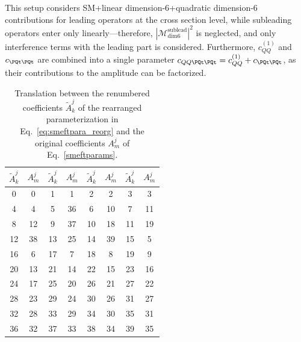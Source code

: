 This setup considers SM+linear dimension-6+quadratic dimension-6 contributions for leading operators at the cross section level, while subleading operators enter only linearly---therefore, $|\mathcal{M}_{\text{dim6}}^{\text{sublead}}|^2$ is neglected, and only interference terms with the leading part is considered. Furthermore, $c_{QQ}^{(1)}$ and $c_{\PQt\PQt}$ are combined into a single parameter $c_{QQ\PQt\PQt}=c_{QQ}^{(1)}+c_{\PQt\PQt}$, as their contributions to the amplitude can be factorized.

\begin{table}[h]
\centering
\renewcommand{\arraystretch}{1.2}
\begin{tabular}{cc|cc|cc|cc}
\hline
$\widetilde{A}^j_k$ & $A^j_m$ & $\widetilde{A}^j_k$ & $A^j_m$ & $\widetilde{A}^j_k$ & $A^j_m$ & $\widetilde{A}^j_k$ & $A^j_m$ \\
\hline
0 & 0 & 1 & 1 & 2 & 2 & 3 & 3 \\
4 & 4 & 5 & 36 & 6 & 10 & 7 & 11 \\
8 & 12 & 9 & 37 & 10 & 18 & 11 & 19 \\
12 & 38 & 13 & 25 & 14 & 39 & 15 & 5 \\
16 & 6 & 17 & 7 & 18 & 8 & 19 & 9 \\
20 & 13 & 21 & 14 & 22 & 15 & 23 & 16 \\
24 & 17 & 25 & 20 & 26 & 21 & 27 & 22 \\
28 & 23 & 29 & 24 & 30 & 26 & 31 & 27 \\
32 & 28 & 33 & 29 & 34 & 30 & 35 & 31 \\
36 & 32 & 37 & 33 & 38 & 34 & 39 & 35 \\
\hline
\end{tabular}
\caption{Translation between the renumbered coefficients $\widetilde{A}^j_k$ of the rearranged parameterization in Eq.~\eqref{eq:smeftpara_reorg} and the original coefficients $A^j_m$ of Eq.~\eqref{smeftparams}.}
\label{tab:smeft_index_translation}
\end{table}

